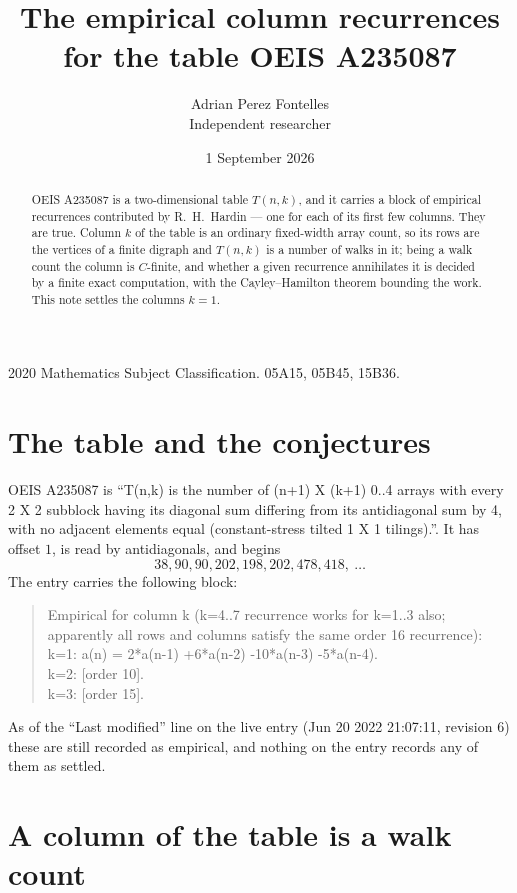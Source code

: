 \documentclass[11pt,a4paper]{article}
\title{The empirical column recurrences for the table OEIS A235087}
\author{Adrian Perez Fontelles\\ \small Independent researcher}
\date{1 September 2026}
\theoremstyle{plain}
\theoremstyle{definition}
\begin{document}
\maketitle

\begin{abstract}
OEIS A235087 is a two-dimensional table $T(n,k)$, and it carries a block of empirical
recurrences contributed by R.~H.~Hardin --- one for each of its first few columns. They are
true. Column $k$ of the table is an ordinary fixed-width array count, so its rows are the
vertices of a finite digraph and $T(n,k)$ is a number of walks in it; being a walk count the
column is $C$-finite, and whether a given recurrence annihilates it is decided by a finite
exact computation, with the Cayley--Hamilton theorem bounding the work. This note settles the columns $k=1$.
\end{abstract}

\noindent\small 2020 Mathematics Subject Classification. 05A15, 05B45, 15B36.\normalsize

\section{The table and the conjectures}

OEIS A235087 is ``T(n,k) is the number of (n+1) X (k+1) 0..4 arrays with every 2 X 2 subblock having its diagonal sum differing from its antidiagonal sum by 4, with no adjacent elements equal (constant-stress tilted 1 X 1 tilings).''. It has offset $1$, is
read by antidiagonals, and begins
\[
38, 90, 90, 202, 198, 202, 478, 418,\ \dots
\]
The entry carries the following block:
\begin{quote}\small
Empirical for column k (k=4..7 recurrence works for k=1..3 also; apparently all rows and columns satisfy the same order 16 recurrence):\\
k=1: a(n) = 2*a(n-1) +6*a(n-2) -10*a(n-3) -5*a(n-4).\\
k=2: [order 10].\\
k=3: [order 15].\\
\end{quote}
As of the ``Last modified'' line on the live entry (Jun 20 2022 21:07:11, revision 6) these are still
recorded as empirical, and nothing on the entry records any of them as settled.

\section{A column of the table is a walk count}
\end{document}
